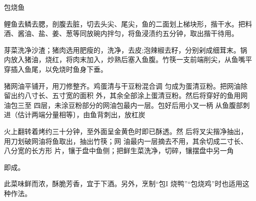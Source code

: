 \begin{recipe}{包烧鱼}

\ingredients


\cooking

\step 鲤鱼去鳞去腮，剖腹去脏，切去头尖、尾尖，鱼的二面划上梯块形，揩干水。把料酒、酱油、盐、姜、葱等同放碗内拌匀，将鱼浸渍约五分钟，取出揩干待用。

\step 芽菜洗净沙渣；猪肉选用肥瘦的，洗净，去皮;泡辣椒去籽，分别剁成细茸末。锅内放入猪油，烧红，将肉末加入，炒熟后塞入鱼腹。竹筷一支前端削尖，从鱼嘴平穿插入鱼尾，以免烧时鱼身下垂。

猪网油平铺开，用刀修整齐。鸡蛋清与干豆粉混合调 匀成为蛋清豆粉。把网油除留出约八寸长、五寸宽的面积 外，其余全部涂上蛋清豆粉。然后将穿好的鱼用网油包三至 四层，未涂豆粉部分的网油包最内一层。包好后用小叉一柄 从鱼腹部刺进（估计两端分量相等〕，由鱼背刺出，放杠炭

火上翻转着烤约三十分钟，至外面呈金黄色时即已酥透。然 后将叉尖揩净抽出，用刀划破网油将鱼取出，抽出竹筷；网 油最内一层摘去不用，其余切成二寸长、八分宽的长方形 片，镶于盘中鱼侧；把鲜生菜洗净，切碎，镶摆盘中另一角

即成。

\notes

此菜味鲜而浓，酥脆芳香，宜于下酒。另外，烹制“包I 烧鸭”“包烧鸡”时也适用这种作法。

\end{recipe}

